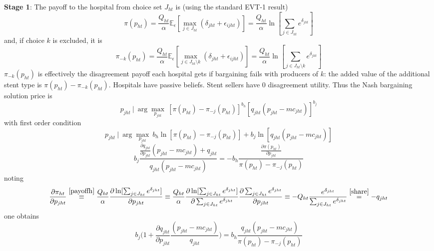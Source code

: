\documentclass[11pt]{article}
\numberwithin{equation}{section}
\begin{document}
\textbf{Stage 1}: The payoff to the hospital from choice set $J_{ht}$ is (using the standard EVT-1 result)
\begin{equation}
\label{payoffh}
	\pi (p_{ht}) = \frac{Q_{ht}}{\alpha} \mathbb{E}_\epsilon [\max_{j \in J_{ht}} (\delta_{jht} + \epsilon_{ijht})] = \frac{Q_{ht}}{\alpha} \ln [\sum_{j \in J_{ht}} e^{\delta_{jht}}]
\end{equation}
and, if choice $k$ is excluded, it is
\begin{equation}
	\pi_{-k} (p_{ht}) = \frac{Q_{ht}}{\alpha} \mathbb{E}_\epsilon [\max_{j \in J_{ht} \setminus k} (\delta_{jht} + \epsilon_{ijht})] = \frac{Q_{ht}}{\alpha} \ln [\sum_{j \in J_{ht} \setminus k} e^{\delta_{jht}}]
\end{equation}
$\pi_{-k} (p_{ht})$ is effectively the disagreement payoff each hospital gets if bargaining fails with producers of $k$: the added value of the additional stent type is $\pi(p_{ht}) - \pi_{-k} (p_{ht})$. Hospitals have passive beliefs. Stent sellers have 0 disagreement utility. Thus the Nash bargaining solution price is
\begin{equation}
  p_{jht} ~|~ \arg \max_{p_{jht}} ~ [\pi(p_{ht}) - \pi_{-j} (p_{ht})]^{b_{h}}[q_{jht}(p_{jht} - mc_{jht})]^{b_j}
\end{equation}
with first order condition
\begin{equation*}
	p_{jht} ~|~ \arg \max_{p_{jht}} ~b_h \ln [\pi(p_{ht}) - \pi_{-j} (p_{ht})] + b_j \ln [q_{jht}(p_{jht} - mc_{jht})]
\end{equation*}
\begin{equation*}
	b_j  \frac{\frac{\partial q_{jht}}{\partial p_{jht}}(p_{jht} - mc_{jht}) + q_{jht}}{q_{jht}(p_{jht} - mc_{jht})} = - 	b_h \frac{\frac{\partial \pi(p_{ht})}{\partial p_{jht}}}{\pi(p_{ht}) - \pi_{-j} (p_{ht})}
\end{equation*}
noting
\begin{equation*}
 \frac{\partial \pi_{ht}}{\partial p_{jht}} \overset{\eqref{payoffh}}{\equiv} \frac{Q_{ht}}{\alpha} \frac{\partial  \ln [\sum_{j \in J_{ht}} e^{\delta_{jht}}]}{\partial p_{jht}} \equiv \frac{Q_{ht}}{\alpha} \frac{\partial  \ln [\sum_{j \in J_{ht}} e^{\delta_{jht}}]}{\partial \sum_{j \in J_{ht}} e^{\delta_{jht}}} \frac{\partial \sum_{j \in J_{ht}} e^{\delta_{jht}}}{\partial p_{jht}} \equiv - Q_{ht} \frac{e^{\delta_{jht}}}{\sum_{j \in J_{ht}} e^{\delta_{jht}}} \overset{\eqref{share}}{=} - q_{jht}
\end{equation*}
one obtains
\begin{equation*}
b_j \bigg( 1 + \frac{\partial q_{jht}}{\partial p_{jht}} \frac{(p_{jht} - mc_{jht})}{q_{jht}} \bigg) = b_h \frac{q_{jht}(p_{jht} - mc_{jht})}{\pi(p_{ht}) - \pi_{-j} (p_{ht})}
\end{equation*}
\end{document}
